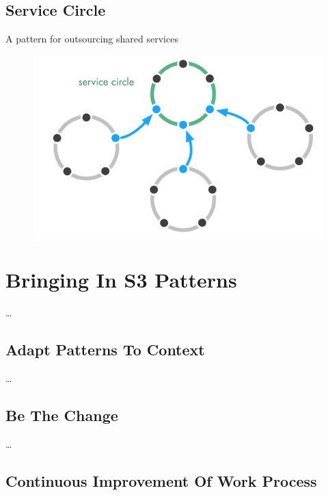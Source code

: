 \section{Service Circle}
\label{servicecircle}

A pattern for outsourcing shared services

\begin{figure}[htbp]
\centering
\includegraphics[keepaspectratio,width=\textwidth,height=0.75\textheight]{img/structural-patterns/service-circle.png}
\end{figure}

\chapter{Bringing In S3 Patterns}
\label{bringingins3patterns}

{\ldots}

\section{Adapt Patterns To Context}
\label{adaptpatternstocontext}

{\ldots}

\section{Be The Change}
\label{bethechange}

{\ldots}

\section{Continuous Improvement Of Work Process}
\label{continuousimprovementofworkprocess}

